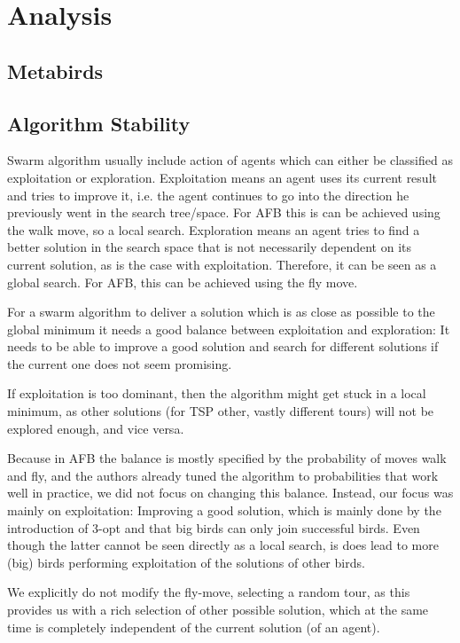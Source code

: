 \section{Analysis}
\subsection{Metabirds}
\subsection{Algorithm Stability} \label{Algorithm Stability}
Swarm algorithm usually include action of agents which can either be classified as exploitation or exploration.
Exploitation means an agent uses its current result and tries to improve it, i.e. the agent continues to go into the direction he previously went in the search tree/space.
For AFB this is can be achieved using the walk move, so a local search.
Exploration means an agent tries to find a better solution in the search space that is not necessarily dependent on its current solution, as is the case with exploitation. Therefore, it can be seen as a global search. For AFB, this can be achieved using the fly move.


For a swarm algorithm to deliver a solution which is as close as possible to the global minimum it needs a good balance between exploitation and exploration: It needs to be able to improve a good solution and search for different solutions if the current one does not seem promising.

If exploitation is too dominant, then the algorithm might get stuck in a local minimum, as other solutions (for TSP other, vastly different tours) will not be explored enough, and vice versa.


Because in AFB the balance is mostly specified by the probability of moves walk and fly, and the authors already tuned the algorithm to probabilities that work well in practice, we did not focus on changing this balance.
Instead, our focus was mainly on exploitation: Improving a good solution, which is mainly done by the introduction of 3-opt and that big birds can only join successful birds. Even though the latter cannot be seen directly as a local search, is does lead to more (big) birds performing exploitation of the solutions of other birds.


We explicitly do not modify the fly-move, selecting a random tour, as this provides us with a rich selection of other possible solution, which at the same time is completely independent of the current solution (of an agent).

